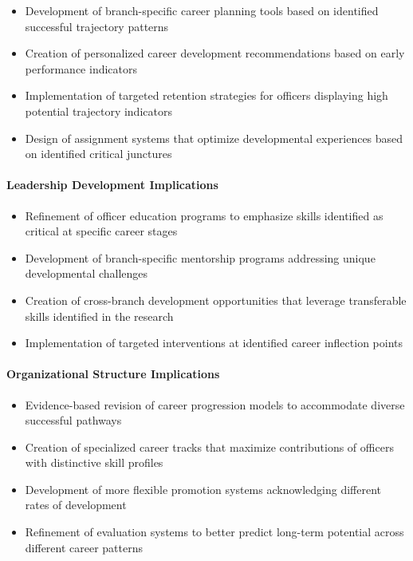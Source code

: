 \documentclass[./main.tex]{subfiles}
\begin{document}
\begin{itemize}
\tightlist
\item
  Development of branch-specific career planning tools based on
  identified successful trajectory patterns
\item
  Creation of personalized career development recommendations based on
  early performance indicators
\item
  Implementation of targeted retention strategies for officers
  displaying high potential trajectory indicators
\item
  Design of assignment systems that optimize developmental experiences
  based on identified critical junctures
\end{itemize}

\paragraph{Leadership Development
Implications}\label{leadership-development-implications}

\begin{itemize}
\tightlist
\item
  Refinement of officer education programs to emphasize skills
  identified as critical at specific career stages
\item
  Development of branch-specific mentorship programs addressing unique
  developmental challenges
\item
  Creation of cross-branch development opportunities that leverage
  transferable skills identified in the research
\item
  Implementation of targeted interventions at identified career
  inflection points
\end{itemize}

\paragraph{Organizational Structure
Implications}\label{organizational-structure-implications}

\begin{itemize}
\tightlist
\item
  Evidence-based revision of career progression models to accommodate
  diverse successful pathways
\item
  Creation of specialized career tracks that maximize contributions of
  officers with distinctive skill profiles
\item
  Development of more flexible promotion systems acknowledging different
  rates of development
\item
  Refinement of evaluation systems to better predict long-term potential
  across different career patterns
\end{itemize}
\end{document}
